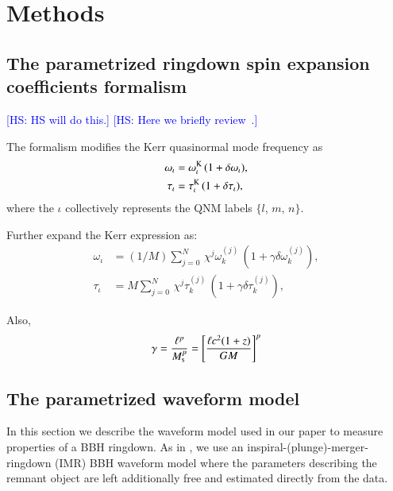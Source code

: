 \documentclass[twocolumn,prd,aps,superscriptaddress,preprintnumbers,tightenlines,showpacs,nofootinbib,eqsecnum,amsfonts,amsmath,longbibliography]{revtex4-1}
\newcommand{\hs}[1]{{\textcolor{blue}{{[HS: #1]}} }}
\begin{document}
\section{Methods}
\label{sec:method}

\subsection{The parametrized ringdown spin expansion coefficients formalism}
\label{sec:review_parspec}

\hs{HS will do this.}
\hs{Here we briefly review~\cite{Maselli:2019mjd,Carullo:2021dui}.}

The formalism modifies the Kerr quasinormal mode frequency as
%
\begin{subequations}
\begin{align}
\omega_{\iota} &= \omega^{\rm K}_{\iota} \, (1 + \delta \omega_{\iota}), \\
\tau_{\iota}   &= \tau^{\rm K}_{\iota}   \, (1 + \delta \tau_{\iota}),
\end{align}
\label{eq:general_deviation}
\end{subequations}
%
where the $\iota$ collectively represents the QNM labels $\{l,\, m,\, n\}$.

Further expand the Kerr expression as:
%
\begin{subequations}
\begin{align}
\omega_{\iota} &= (1/M) \sum_{j = 0}^{N} \, \chi^{j} \omega^{(j)}_{k} \, \left( 1 + \gamma \delta \omega^{(j)}_{k} \right), \\
\tau_{\iota}   &= M     \sum_{j = 0}^{N} \, \chi^{j} \tau^{(j)}_{k}   \, \left( 1 + \gamma \delta \tau^{(j)}_{k} \right),
\end{align}
\label{eq:kerr_expansion}
\end{subequations}

Also,
%
\begin{equation}
\gamma
%
= \frac{\ell^{p}}{M_{\rm s}^{p}}
%
%
= \left[
\frac{\ell c^2 (1 + z)}{G M}
\right]^{p}
\label{eq:def_gamma}
\end{equation}

\subsection{The parametrized waveform model}
\label{sec:review_pSEOB}



In this section we describe the waveform model used in our paper to measure properties of a BBH ringdown. As in \cite{Brito:2018rfr,Ghosh:2021mrv}, we use an inspiral-(plunge)-merger-ringdown (IMR) BBH waveform model where the parameters describing the remnant object are left additionally free and estimated directly from the data.
\end{document}
